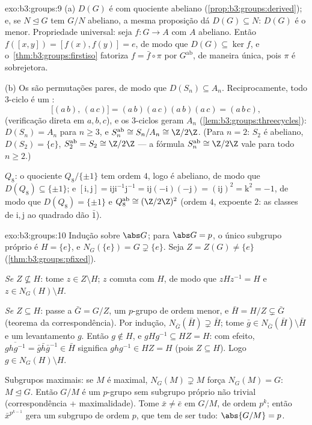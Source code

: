 \begin{solution}{exo:b3:groups:9}
(a) $D(G)$ é  com quociente abeliano (\cref{prop:b3:groups:derived}); e, se
$N \trianglelefteq G$ tem $G/N$ abeliano, a mesma proposição dá $D(G) \subseteq N$: $D(G)$ é o
menor. Propriedade universal: seja $f \colon G \to A$ com $A$ abeliano. Então
$f([x,y]) = [f(x), f(y)] = e$, de modo que $D(G)
\subseteq \ker f$, e o~\cref{thm:b3:groups:firstiso} fatoriza $f =
\bar f \circ \pi$ por $G^{\mathrm{ab}}$,
de maneira única, pois $\pi$ é sobrejetora.

(b) Os  são permutações pares, de modo que $D(S_n) \subseteq A_n$.
Reciprocamente, todo $3$-ciclo é um :
\[
\bigl[(a\,b),\,(a\,c)\bigr] = (a\,b)(a\,c)(a\,b)(a\,c) =
(a\,b\,c),
\]
(verificação direta em $a, b, c$), e os $3$-ciclos geram $A_n$
(\cref{lem:b3:groups:threecycles}): $D(S_n) = A_n$ para $n \geq 3$, e $S_n^{\mathrm{ab}} \cong S_n/A_n \cong \Z/2\Z$. (Para $n = 2$: $S_2$
é abeliano, $D(S_2) = \{e\}$, $S_2^{\mathrm{ab}} = S_2
\cong \Z/2\Z$ --- a fórmula $S_n^{\mathrm{ab}} \cong \Z/2\Z$ vale para todo $n \geq 2$.)

$Q_8$: o quociente $Q_8/\{\pm 1\}$ tem ordem $4$, logo é abeliano, de modo
que $D(Q_8) \subseteq \{\pm 1\}$; e $[\mathrm i, \mathrm
j] = \mathrm i \mathrm j \mathrm i^{-1}\mathrm j^{-1} = \mathrm
i\mathrm j(-\mathrm i)(-\mathrm j) = (\mathrm i \mathrm j)^2 =
\mathrm k^2 = -1$, de modo que $D(Q_8) = \{\pm 1\}$ e $Q_8^{\mathrm{ab}} \cong (\Z/2\Z)^2$ (ordem $4$, expoente
$2$: as classes de $\mathrm i, \mathrm j$ ao quadrado dão $\bar 1$).
\end{solution}

\begin{solution}{exo:b3:groups:10}
Indução sobre $\abs G$; para $\abs G = p$, o único subgrupo próprio é $H = \{e\}$,
e $N_G(\{e\}) = G \supsetneq
\{e\}$. Seja $Z = Z(G) \neq \{e\}$ (\cref{thm:b3:groups:pfixed}).

\emph{Se $Z \not\subseteq H$}: tome $z \in Z \setminus H$; $z$ comuta com $H$, de modo que
$zHz^{-1} = H$ e $z \in N_G(H) \setminus
H$.

\emph{Se $Z \subseteq H$}: passe a $\bar G = G/Z$, um $p$-grupo de ordem menor, e $\bar H = H/Z \subsetneq \bar G$
(teorema da correspondência). Por indução, $N_{\bar G}(\bar H) \supsetneq \bar H$; tome $\bar g \in N_{\bar G}(\bar H) \setminus \bar H$ e um
levantamento $g$. Então $g \notin H$, e $gHg^{-1} \subseteq HZ = H$: com efeito, $\overline{ghg^{-1}} = \bar g \bar h \bar g^{-1} \in \bar H$ significa
$ghg^{-1} \in HZ = H$ (pois $Z \subseteq H$). Logo $g \in
N_G(H)\setminus H$.

Subgrupos maximais: se $M$ é maximal, $N_G(M) \supsetneq M$ força $N_G(M) = G$: $M \trianglelefteq G$. Então
$G/M$ é um $p$-grupo sem subgrupo próprio não trivial
(correspondência + maximalidade). Tome $\bar x \neq \bar e$ em $G/M$, de ordem
$p^k$; então $\bar x^{p^{k-1}}$ gera um subgrupo de ordem $p$, que tem de ser
tudo: $\abs{G/M} = p$.
\end{solution}

